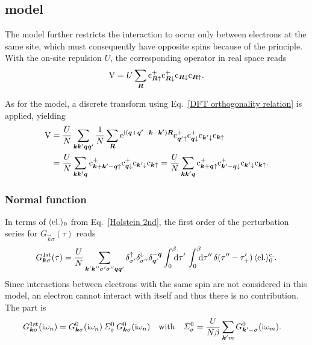 \subsection{ model}
\label{Hubbard model}

The  model further restricts the  interaction to
occur only between electrons at the same site, which must consequently have
opposite spins because of the  principle. With the on-site
 repulsion $U$, the corresponding operator in real space reads
\cite{vonderLindenBergerValasek95}
%
\begin{equation*}
    \mathrm V = U \sum_{\boldsymbol R}
    \mathrm c_{\boldsymbol R \uparrow}^+
    \mathrm c_{\boldsymbol R \downarrow}^+
    \mathrm c_{\boldsymbol R \downarrow}
    \mathrm c_{\boldsymbol R \uparrow}.
\end{equation*}

As for the  model, a discrete  transform using
Eq.~\ref{DFT orthogonality relation} is applied, yielding
%
\begin{align*}
    \mathrm V &=
    \frac U N \sum_{\boldsymbol k \boldsymbol k' \boldsymbol q \boldsymbol q'}
    \frac 1 N \sum_{\boldsymbol R}
    \mathrm e^{\mathrm i (\boldsymbol q + \boldsymbol{q'} - \boldsymbol k - \boldsymbol{k'}) \boldsymbol R}
    \mathrm c_{\boldsymbol q' \uparrow}^+
    \mathrm c_{\boldsymbol q \downarrow}^+
    \mathrm c_{\boldsymbol k' \downarrow}
    \mathrm c_{\boldsymbol k \uparrow}
    \\
    &= \frac U N \sum_{\boldsymbol k \boldsymbol k' \boldsymbol q}
    \mathrm c_{\boldsymbol k + \boldsymbol k' - \boldsymbol q \uparrow}^+
    \mathrm c_{\boldsymbol q \downarrow}^+
    \mathrm c_{\boldsymbol k' \downarrow}
    \mathrm c_{\boldsymbol k \uparrow}
    = \frac U N \sum_{\boldsymbol k \boldsymbol k' \boldsymbol q}
    \mathrm c_{\boldsymbol k + \boldsymbol q \uparrow}^+
    \mathrm c_{\boldsymbol k' - \boldsymbol q \downarrow}^+
    \mathrm c_{\boldsymbol k' \downarrow} \mathrm c_{\boldsymbol k \uparrow}.
\end{align*}

\subsubsection{Normal  function}

In terms of $\langle\text{el.}\rangle_0$ from Eq.~\ref{Holstein 2nd}, the first order of
the perturbation series for $G_{\vec k \sigma}(\tau)$ reads
%
\begin{equation*}
    G \super{1st}_{\vec k \sigma}(\tau) =
    \frac U N \sum_{\vec k' \vec k'' \sigma' \sigma'' \vec q \vec q'}
    \delta_{\sigma'}^\up \delta_{\sigma''}^\down \delta_{\vec q'}^{-\vec q}
    \int \from 0 \till \beta \D \tau' \,
    \int \from 0 \till \beta \D \tau'' \,
    \delta(\tau'' - \tau'_+) \,
    \av{\text{el.}}_0 \super{c.}.
\end{equation*}
%
Since interactions between electrons with the same spin are not considered in
this model, an electron cannot interact with itself and thus there is no
 contribution. The  part is
%
\begin{align*}
    G \sp{\text{1st}}_{\boldsymbol k \sigma}(\mathrm i \omega_n)
    &= G^0_{\boldsymbol k \sigma}(\mathrm i \omega_n) \,
    \varSigma^0_\sigma \,
    G^0_{\boldsymbol k \sigma}(\mathrm i \omega_n)
    \quad \text{with} \quad
    \varSigma^0_\sigma
    = \frac U {N \beta} \sum_{\boldsymbol k' m} G^0_{\boldsymbol k' -\sigma}(\mathrm i \omega_m).
\end{align*}

